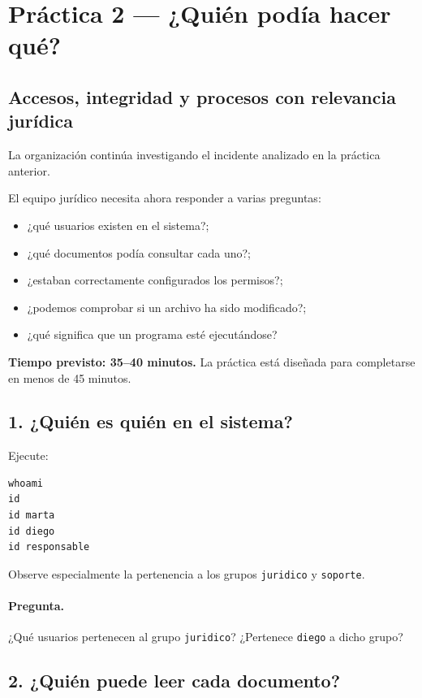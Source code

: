 \section*{Práctica 2 --- ¿Quién podía hacer qué?}
\subsection*{Accesos, integridad y procesos con relevancia jurídica}

La organización continúa investigando el incidente analizado en la práctica anterior.

El equipo jurídico necesita ahora responder a varias preguntas:
\begin{itemize}
  \item ¿qué usuarios existen en el sistema?;
  \item ¿qué documentos podía consultar cada uno?;
  \item ¿estaban correctamente configurados los permisos?;
  \item ¿podemos comprobar si un archivo ha sido modificado?;
  \item ¿qué significa que un programa esté ejecutándose?
\end{itemize}

\textbf{Tiempo previsto: 35--40 minutos.} La práctica está diseñada para completarse en menos de 45 minutos.

\subsection*{1. ¿Quién es quién en el sistema?}

Ejecute:
\begin{verbatim}
whoami
id
id marta
id diego
id responsable
\end{verbatim}

Observe especialmente la pertenencia a los grupos \texttt{juridico} y \texttt{soporte}.

\paragraph{Pregunta.}
¿Qué usuarios pertenecen al grupo \texttt{juridico}? ¿Pertenece \texttt{diego} a dicho grupo?

\subsection*{2. ¿Quién puede leer cada documento?}

